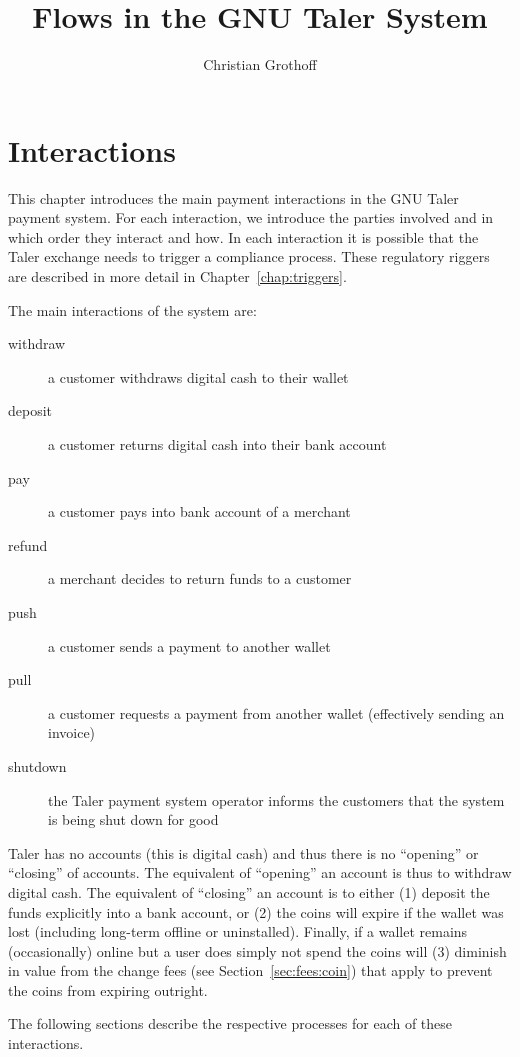 \documentclass[10pt,a4paper,oneside]{book}
\author{Christian Grothoff}
\title{Flows in the GNU Taler System}
\begin{document}
\tableofcontents

\chapter{Interactions} \label{chap:interactions}

This chapter introduces the main payment interactions in the GNU Taler payment
system. For each interaction, we introduce the parties involved and in which
order they interact and how.  In each interaction it is possible that the
Taler exchange needs to trigger a compliance process.  These regulatory
riggers are described in more detail in Chapter~\ref{chap:triggers}.

The main interactions of the system are:

\begin{description}
  \item[withdraw] a customer withdraws digital cash to their wallet
  \item[deposit] a customer returns digital cash into their bank account
  \item[pay] a customer pays into bank account of a merchant
  \item[refund] a merchant decides to return funds to a customer
  \item[push] a customer sends a payment to another wallet
  \item[pull] a customer requests a payment from another wallet (effectively sending an invoice)
  \item[shutdown] the Taler payment system operator informs the customers that the system is being shut down for good
\end{description}

Taler has no accounts (this is digital cash) and thus there is no ``opening''
or ``closing'' of accounts. The equivalent of ``opening'' an account is thus
to withdraw digital cash.  The equivalent of ``closing'' an account is to
either (1) deposit the funds explicitly into a bank account, or (2) the coins
will expire if the wallet was lost (including long-term offline or
uninstalled).  Finally, if a wallet remains (occasionally) online but a user
does simply not spend the coins will (3) diminish in value from the change
fees (see Section~\ref{sec:fees:coin}) that apply to prevent the coins from
expiring outright.

The following sections describe the respective processes for each of these
interactions.








\end{document}

